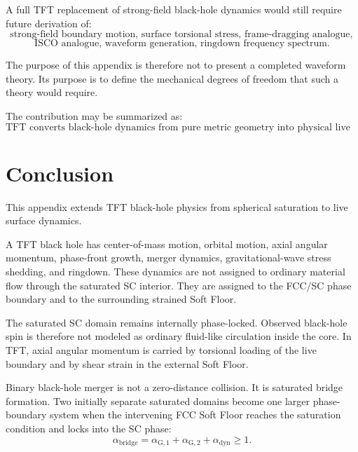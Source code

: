A full TFT replacement of strong-field black-hole dynamics would still require future derivation of:
\begin{equation}
    \text{strong-field boundary motion, surface torsional stress, frame-dragging analogue},
\end{equation}
\begin{equation}
    \text{ISCO analogue, waveform generation, ringdown frequency spectrum}.
\end{equation}

The purpose of this appendix is therefore not to present a completed waveform theory. Its purpose is to define the mechanical degrees of freedom that such a theory would require.

The contribution may be summarized as:
\begin{equation}
    \boxed{\text{TFT converts black-hole dynamics from pure metric geometry into physical live phase-boundary mechanics.}}
\end{equation}

\section{Conclusion}

This appendix extends TFT black-hole physics from spherical saturation to live surface dynamics.

A TFT black hole has center-of-mass motion, orbital motion, axial angular momentum, phase-front growth, merger dynamics, gravitational-wave stress shedding, and ringdown. These dynamics are not assigned to ordinary material flow through the saturated SC interior. They are assigned to the FCC/SC phase boundary and to the surrounding strained Soft Floor.

The saturated SC domain remains internally phase-locked. Observed black-hole spin is therefore not modeled as ordinary fluid-like circulation inside the core. In TFT, axial angular momentum is carried by torsional loading of the live boundary and by shear strain in the external Soft Floor.

Binary black-hole merger is not a zero-distance collision. It is saturated bridge formation. Two initially separate saturated domains become one larger phase-boundary system when the intervening FCC Soft Floor reaches the saturation condition and locks into the SC phase:
\begin{equation}
    \alpha_{\mathrm{bridge}} = \alpha_{\mathrm{G},1} + \alpha_{\mathrm{G},2} + \alpha_{\mathrm{dyn}} \geq 1.
\end{equation}

